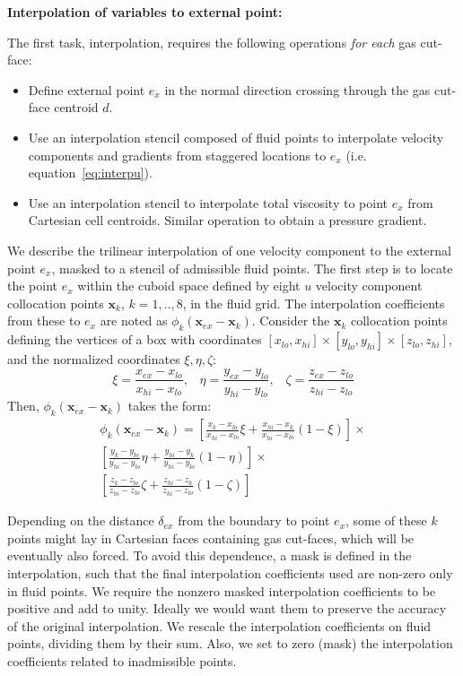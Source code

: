 \documentclass[12pt]{article}
\begin{document}
\bigskip
\noindent 
\textbf{Interpolation of variables to external point:}
\bigskip

The first task, interpolation, requires the following operations \textit{for each} gas cut-face:
%
\begin{itemize}
   \item Define external point $e_x$ in the normal direction crossing through the gas cut-face centroid $d$.
   \item Use an interpolation stencil composed of fluid points to interpolate velocity components and gradients from staggered locations to $e_x$ (i.e. equation~\eqref{eq:interpu}).
   \item Use an interpolation stencil to interpolate total viscosity to point $e_x$ from Cartesian cell centroids. Similar operation to obtain a pressure gradient.   
\end{itemize}
%

We describe the trilinear interpolation of one velocity component to the external point $e_x$, masked to a stencil of admissible fluid points.  
The first step is to locate the point $e_x$ within the cuboid space defined by  eight $u$ velocity component collocation points $\mathbf{x}_k$, $k=1,..,8$, in the fluid grid. The interpolation coefficients from these to $e_x$ are noted as $\phi_k(\mathbf{x}_{ex}-\mathbf{x}_k)$. Consider the $\mathbf{x}_k$ collocation points defining the vertices of a box with coordinates $[x_{lo},x_{hi}] \times [ y_{lo},y_{hi}] \times [z_{lo} , z_{hi}]$, and the normalized coordinates $\xi,\eta,\zeta$:
%
\begin{equation}
   \xi = \frac{x_{ex}-x_{lo}}{x_{hi}-x_{lo}}, \; \; \;  \eta = \frac{y_{ex}-y_{lo}}{y_{hi}-y_{lo}}, \; \; \; \zeta = \frac{z_{ex}-z_{lo}}{z_{hi}-z_{lo}}
\end{equation}
%
Then, $\phi_k(\mathbf{x}_{ex}-\mathbf{x}_k)$ takes the form:
%
\begin{eqnarray}
    \phi_k(\mathbf{x}_{ex}-\mathbf{x}_k) = 
    \left[ \frac{x_{k}-x_{lo}}{x_{hi}-x_{lo}} \xi + \frac{x_{hi}-x_{k}}{x_{hi}-x_{lo}} (1-\xi) \right] \times \nonumber \\
    \left[ \frac{y_{k}-y_{lo}}{y_{hi}-y_{lo}} \eta + \frac{y_{hi}-y_{k}}{y_{hi}-y_{lo}} (1-\eta) \right] \times \nonumber \\
    \left[ \frac{z_{k}-z_{lo}}{z_{hi}-z_{lo}} \zeta + \frac{z_{hi}-z_{k}}{z_{hi}-z_{lo}} (1-\zeta) \right] \; \; \; \; \;
\end{eqnarray}
%

Depending on the distance $\delta_{ex}$ from the boundary to point $e_x$, some of these $k$ points might lay in Cartesian faces containing gas cut-faces, which will be eventually also forced. To avoid this dependence, a mask is defined in the interpolation, such that the final interpolation coefficients used are non-zero only in fluid points. We require the nonzero masked interpolation coefficients to be positive and add to unity. Ideally we would want them to preserve the accuracy of the original interpolation.
We rescale the interpolation coefficients on fluid points, dividing them by their sum. Also, we set to zero (mask) the interpolation coefficients related to inadmissible points.
\end{document}
